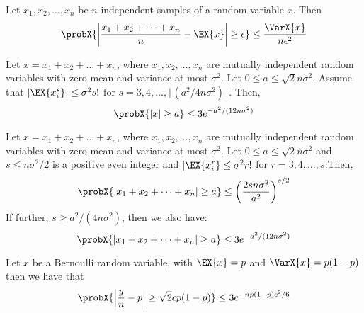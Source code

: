 \documentclass{article}
\begin{document}
\begin{theorem}
  Let $x_1,x_2,\dots, x_n$ be $n$ independent samples of a random variable $x$. Then
  \begin{equation*}
    \probX{\left|\frac{x_1 + x_2 + \dots + x_n}{n} - \EX{x}\right| \geq \epsilon} \leq \frac{\VarX{x}}{n\epsilon^2}
  \end{equation*}
\end{theorem}
\begin{theorem}
  Let $x = x_1 + x_2 + \dots + x_n$, where $x_1,x_2,\dots,x_n$ are mutually independent random variables with zero mean and variance at most $\sigma^2$. Let $0 \leq a \leq \sqrt{2}n\sigma^2$. Assume that $|\EX{x_i^s}| \leq \sigma^2 s!$ for $s = 3,4,\dots, \lfloor(a^2/4n\sigma^2)\rfloor$. Then,
  \begin{equation*}
    \probX{|x| \geq a} \leq 3e^{-a^2/(12n\sigma^2)}
  \end{equation*}
\end{theorem}

\begin{theorem}
  Let $x = x_1 + x_2 + \dots + x_n$, where $x_1,x_2,\dots,x_n$ are mutually independent random variables with zero mean and variance at most $\sigma^2$. Let $0 \leq a \leq \sqrt{2}n\sigma^2$ and $s \leq n\sigma^2/2$ is a positive even integer and $|\EX{x_i^r} \leq \sigma^2 r!$ for $r = 3,4,\dots,s$.Then,
  \begin{equation*}
    \probX{|x_1 + x_2 + \dots + x_n| \geq a} \leq \left(\frac{2sn\sigma^2}{a^2}\right)^{s/2}
  \end{equation*}
  If further, $s \geq a^2/(4n\sigma^2)$, then we also have:
  \begin{equation*}
    \probX{|x_1 + x_2 + \dots + x_n| \geq a} \leq 3e^{-a^2/(12n\sigma^2)}
  \end{equation*}
\end{theorem}

\begin{theorem}
  Let $x$ be a Bernoulli random variable, with $\EX{x} = p$ and $\VarX{x} = p(1-p)$ then we have that
  \begin{equation*}
    \probX{\left|\frac{y}{n} - p \right| \geq \sqrt{2}c p(1-p)} \leq 3 e^{-np(1-p)c^2/6}
  \end{equation*}
\end{theorem}




\end{document}
